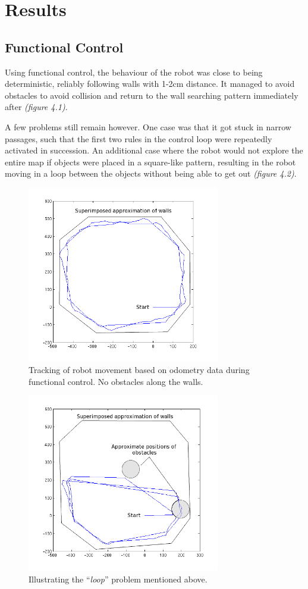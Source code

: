 \documentclass[paper=a4, fontsize=12pt]{scrartcl}	%
\numberwithin{equation}{section}		%
\numberwithin{figure}{section}			%
\numberwithin{table}{section}				%
\begin{document}
\section{Results}
\subsection{Functional Control}
Using functional control, the behaviour of the robot was close to being deterministic, reliably following walls with 1-2cm distance. It managed to avoid obstacles to avoid collision and return to the wall searching pattern immediately after \emph{(figure 4.1)}.

A few problems still remain however. One case was that it got stuck in narrow passages, such that the first two rules in the control loop were repeatedly activated in succession. An additional case where the robot would not explore the entire map if objects were placed in a square-like pattern, resulting in the robot moving in a loop between the objects without being able to get out \emph{(figure 4.2)}.
\begin{figure}[!ht]
 \centering
  \includegraphics[width=0.75\textwidth]{odomap}
  \caption{Tracking of robot movement based on odometry data during functional control. No obstacles along the walls.}
\end{figure}
\begin{figure}[!ht]
 \centering
  \includegraphics[width=0.75\textwidth]{odomap-obst}
  \caption{Illustrating the ``\emph{loop}'' problem mentioned above.}
\end{figure}
\end{document}
